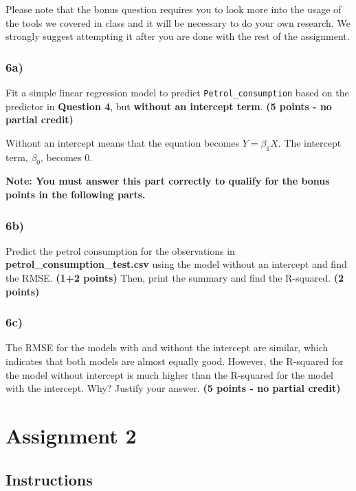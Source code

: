 \documentclass[
  letterpaper,
  DIV=11,
  numbers=noendperiod]{scrreprt}
\begin{document}
Please note that the bonus question requires you to look more into the
usage of the tools we covered in class and it will be necessary to do
your own research. We strongly suggest attempting it after you are done
with the rest of the assignment.

\subsection{6a)}\label{a-4}

Fit a simple linear regression model to predict
\texttt{Petrol\_consumption} based on the predictor in \textbf{Question
4}, but \textbf{without an intercept term}. \textbf{(5 points - no
partial credit)}

Without an intercept means that the equation becomes \(Y = \beta_1X\).
The intercept term, \(\beta_0\), becomes 0.

\textbf{Note: You must answer this part correctly to qualify for the
bonus points in the following parts.}

\subsection{6b)}\label{b-4}

Predict the petrol consumption for the observations in
\textbf{petrol\_consumption\_test.csv} using the model without an
intercept and find the RMSE. \textbf{(1+2 points)} Then, print the
summary and find the R-squared. \textbf{(2 points)}

\subsection{6c)}\label{c-2}

The RMSE for the models with and without the intercept are similar,
which indicates that both models are almost equally good. However, the
R-squared for the model without intercept is much higher than the
R-squared for the model with the intercept. Why? Justify your answer.
\textbf{(5 points - no partial credit)}

\chapter{Assignment 2}\label{assignment-2}

\section*{Instructions}\label{instructions-1}
\end{document}
